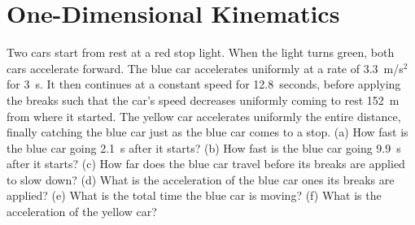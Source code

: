 \documentclass[]{flipit}
\begin{document}
\chapter{One-Dimensional Kinematics}

\begin{question}
    \item Two cars start from rest at a red stop light. When the light turns green, both cars accelerate forward. The blue car accelerates uniformly at a rate of 3.3~m/s$^2$ for 3~s. It then continues at a constant speed for 12.8~seconds, before applying the breaks such that the car's speed decreases uniformly coming to rest 152~m from where it started. The yellow car accelerates uniformly the entire distance, finally catching the blue car just as the blue car comes to a stop. (a) How fast is the blue car going 2.1~s after it starts? (b) How fast is the blue car going 9.9~s after it starts? (c) How far does the blue car travel before its breaks are applied to slow down? (d) What is the acceleration of the blue car ones its breaks are applied? (e) What is the total time the blue car is moving? (f) What is the acceleration of the yellow car?
\end{question}
\end{document}
